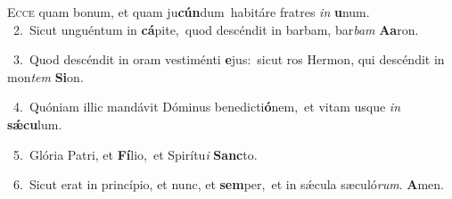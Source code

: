 \lettrine{\initial\textcolor{\initialcolor}{E}}{cce} quam bonum, et quam ju\-\textbf{cún}\-dum~\star habitáre fratres \textit{in} \textbf{u}\-num.\\
{\numbfont\textcolor{\numbcolor}{~2.}}~Sicut unguéntum in \textbf{cá}\-pite,~\star quod descéndit in barbam, bar\textit{bam} \textbf{A}\-\textbf{a}ron.\par
{\numbfont\textcolor{\numbcolor}{~3.}}~Quod descéndit in oram vestiménti \textbf{e}\-jus:~\star sicut ros Hermon, qui descéndit in mon\textit{tem} \textbf{Si}\-on.\par
{\numbfont\textcolor{\numbcolor}{~4.}}~Quóniam illic mandávit Dóminus benedicti\-\textbf{ó}\-nem,~\star et vitam usque \textit{in} \textbf{sǽ}\-\textbf{cu}lum.\par
{\numbfont\textcolor{\numbcolor}{~5.}}~Glória Patri, et \textbf{Fí}\-lio,~\star et Spirítu\textit{i} \textbf{Sanc}\-to.\par
{\numbfont\textcolor{\numbcolor}{~6.}}~Sicut erat in princípio, et nunc, et \textbf{sem}\-per,~\star et in sǽcula sæculó\-\textit{rum}\-. \textbf{A}\-men.\par
